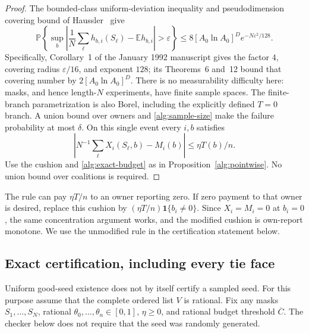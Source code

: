 \documentclass[11pt]{article}
\theoremstyle{definition}\newtheorem{definition}[theorem]{Definition}
\theoremstyle{remark}\newtheorem{remark}[theorem]{Remark}
\newcommand{\E}{\mathbb E}
\newcommand{\Prob}{\mathbb P}
\newcommand{\ind}{\mathbf 1}
\begin{document}
\begin{proof}
The bounded-class uniform-deviation inequality and pseudodimension covering
bound of Haussler~\cite{Haussler1992} give
\begin{equation}\label{alg:uniform-tail}
 \Prob\left\{\sup_b\left|\frac1N\sum_\ell h_{b,i}(S_\ell)
                  -\E h_{b,i}\right|>\varepsilon\right\}
 \le8[A_0\ln A_0]^D e^{-N\varepsilon^2/128}.
\end{equation}
Specifically, Corollary~1 of the January 1992 manuscript gives the factor
$4$, covering radius $\varepsilon/16$, and exponent $128$; its Theorems~6
and~12 bound that covering number by $2[A_0\ln A_0]^D$.
There is no measurability difficulty here: masks, and hence length-$N$
experiments, have finite sample spaces.  The finite-branch parametrization
is also Borel, including the explicitly defined $T=0$ branch.
A union bound over owners and \eqref{alg:sample-size} make the failure
probability at most $\delta$.  On this single event every $i,b$ satisfies
\[
 \left|N^{-1}\sum_\ell X_i(S_\ell,b)-M_i(b)\right|
       \le\eta T(b)/n.
\]
Use the cushion and \eqref{alg:exact-budget} as in
Proposition~\ref{alg:pointwise}.  No union bound over coalitions is required.
\end{proof}
The rule can pay $\eta T/n$ to an owner reporting zero.  If zero payment to
that owner is desired, replace this cushion by
$(\eta T/n)\ind\{b_i\ne0\}$.  Since $X_i=M_i=0$ at $b_i=0$, the same
concentration argument works, and the modified cushion is own-report monotone.
We use the unmodified rule in the certification statement below.

\subsection{Exact certification, including every tie face}
Uniform good-seed existence does not by itself certify a sampled seed.
For this purpose assume that the complete ordered list $V$ is rational.
Fix any masks $S_1,\ldots,S_N$, rational $\theta_0,\ldots,\theta_n\in[0,1]$,
$\eta\ge0$, and rational budget threshold $\overline C$.
The checker below does not require that the seed was randomly generated.
\end{document}
